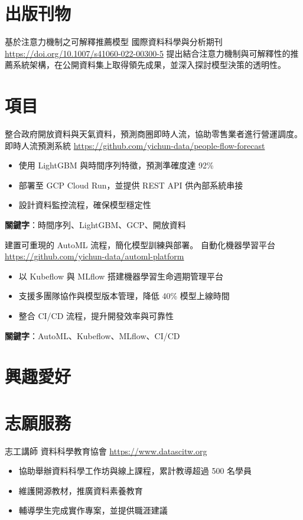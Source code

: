 \documentclass[a4paper, serif, 10pt]{moderncv}
\begin{document}
\section{出版刊物}

        {基於注意力機制之可解釋推薦模型}
        {國際資料科學與分析期刊}
        {\url{https://doi.org/10.1007/s41060-022-00300-5}}
        {}
        {提出結合注意力機制與可解釋性的推薦系統架構，在公開資料集上取得領先成果，並深入探討模型決策的透明性。}
\section{項目}

        {整合政府開放資料與天氣資料，預測商圈即時人流，協助零售業者進行營運調度。}
        {即時人流預測系統}
        {\url{https://github.com/yichun-data/people-flow-forecast}}
        {}
        {\begin{itemize}
\item 使用 LightGBM 與時間序列特徵，預測準確度達 92\%
\item 部署至 GCP Cloud Run，並提供 REST API 供內部系統串接
\item 設計資料監控流程，確保模型穩定性
\end{itemize}
\textbf{關鍵字}：時間序列、LightGBM、GCP、開放資料}

        {建置可重現的 AutoML 流程，簡化模型訓練與部署。}
        {自動化機器學習平台}
        {\url{https://github.com/yichun-data/automl-platform}}
        {}
        {\begin{itemize}
\item 以 Kubeflow 與 MLflow 搭建機器學習生命週期管理平台
\item 支援多團隊協作與模型版本管理，降低 40\% 模型上線時間
\item 整合 CI/CD 流程，提升開發效率與可靠性
\end{itemize}
\textbf{關鍵字}：AutoML、Kubeflow、MLflow、CI/CD}
\section{興趣愛好}

\section{志願服務}

        {志工講師}
        {資料科學教育協會}
        {\url{https://www.datascitw.org}}
        {}
        {\begin{itemize}
\item 協助舉辦資料科學工作坊與線上課程，累計教導超過 500 名學員
\item 維護開源教材，推廣資料素養教育
\item 輔導學生完成實作專案，並提供職涯建議
\end{itemize}}
\end{document}
